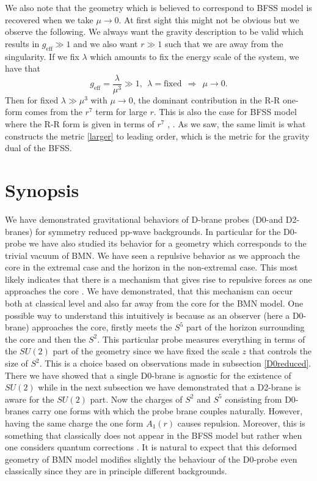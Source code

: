 \documentclass[11pt,english]{article}
\newcommand{\be}{\begin{equation}}
\newcommand{\ee}{\end{equation}}
\numberwithin{equation}{section}
\begin{document}
We also note that the geometry which is believed to correspond to BFSS model is recovered when we take $\mu\to 0$. At first sight this might not be obvious but we observe the following. We always want the gravity description to be valid which results in $g_{\text{eff}}\gg1$ and we also want $r\gg1 $ such that we are away from the singularity. If we fix $\lambda$ which amounts to fix the energy scale of the system, we have that 
\be 
g_{\text{eff}}=\frac{\lambda}{\mu^3}\gg1,~~\lambda=\text{fixed}~~\Rightarrow~~ \mu\to0.
\ee 
Then for fixed $\lambda\gg \mu^3$ with $\mu\to 0$, the dominant contribution in the R-R one-form comes from the $r^7$ term for large $r$. This is also the case for BFSS model where the R-R form is given in terms of $r^7$ \cite{Maldacena2018}, \cite{Itzhaki1998}. As we saw, the same limit is what constructs the metric \eqref{larger} to leading order, which is the metric for the gravity dual of the BFSS.  


\section{Synopsis}\label{synopsis}


We have demonstrated gravitational behaviors of D-brane probes (D0-and D2-branes) for symmetry reduced pp-wave backgrounds. In particular for the D0-probe we have also studied its behavior for a geometry which corresponds to the trivial vacuum of BMN. We have seen a repulsive behavior as we approach the core in the extremal case and the horizon in the non-extremal case. This most likely indicates that there is a mechanism that gives rise to repulsive forces as one approaches the core \cite{Peet2000}. We have demonstrated, that this mechanism can occur both at classical level and also far away from the core for the BMN model.  One possible way to understand this intuitively is because as an observer (here a D0-brane) approaches the core, firstly meets the $S^5$ part of the horizon surrounding the core and then the $S^2$. This particular probe measures everything in terms of the $SU(2)$ part of the geometry since we have fixed the scale $z$ that controls the size of $S^2$. This is a choice based on observations made in subsection \ref{D0reduced}. There we have showed that a single D0-brane is agnostic for the existence of $SU(2)$ while in the next subsection we have demonstrated that a D2-brane is aware for the $SU(2)$ part.   Now the charges of $S^2$ and $S^5$ consisting from D0-branes carry one forms with which the probe brane couples naturally. However, having the same charge the one form $A_1(r)$ causes repulsion. Moreover, this is something that classically does not appear in the BFSS model but rather when one considers quantum corrections \cite{Hyakutake2014}. It is natural to expect that this deformed geometry of BMN model modifies slightly the behaviour of the D0-probe even classically since they are in principle different backgrounds. 
\end{document}
